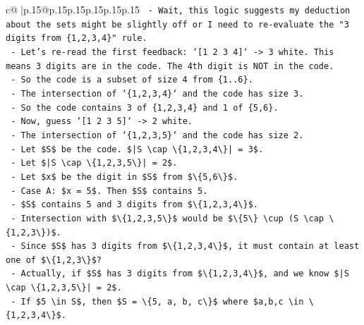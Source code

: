 \documentclass{article}
\begin{document}
{\begin{supertabular}{c@{$\;$}|p{.15\linewidth}@{}p{.15\linewidth}p{.15\linewidth}p{.15\linewidth}p{.15\linewidth}p{.15\linewidth}}
{{{\texttt{    {-} Wait, this logic suggests my deduction about the sets might be slightly off or I need to re{-}evaluate the "3 digits from \{1,2,3,4\}" rule.} \\
\texttt{    {-} Let's re{-}read the first feedback: `{[}1 2 3 4{]}` {-}> 3 white. This means 3 digits are in the code. The 4th digit is NOT in the code.} \\
\texttt{      {-} So the code is a subset of size 4 from \{1..6\}.} \\
\texttt{      {-} The intersection of `\{1,2,3,4\}` and the code has size 3.} \\
\texttt{      {-} So the code contains 3 of \{1,2,3,4\} and 1 of \{5,6\}.} \\
\texttt{    {-} Now, guess `{[}1 2 3 5{]}` {-}> 2 white.} \\
\texttt{      {-} The intersection of `\{1,2,3,5\}` and the code has size 2.} \\
\texttt{      {-} Let \$S\$ be the code. \$|S \textbackslash{}cap \textbackslash{}\{1,2,3,4\textbackslash{}\}| = 3\$.} \\
\texttt{      {-} Let \$|S \textbackslash{}cap \textbackslash{}\{1,2,3,5\textbackslash{}\}| = 2\$.} \\
\texttt{      {-} Let \$x\$ be the digit in \$S\$ from \$\textbackslash{}\{5,6\textbackslash{}\}\$.} \\
\texttt{      {-} Case A: \$x = 5\$. Then \$S\$ contains 5.} \\
\texttt{        {-} \$S\$ contains 5 and 3 digits from \$\textbackslash{}\{1,2,3,4\textbackslash{}\}\$.} \\
\texttt{        {-} Intersection with \$\textbackslash{}\{1,2,3,5\textbackslash{}\}\$ would be \$\textbackslash{}\{5\textbackslash{}\} \textbackslash{}cup (S \textbackslash{}cap \textbackslash{}\{1,2,3\textbackslash{}\})\$.} \\
\texttt{        {-} Since \$S\$ has 3 digits from \$\textbackslash{}\{1,2,3,4\textbackslash{}\}\$, it must contain at least one of \$\textbackslash{}\{1,2,3\textbackslash{}\}\$?} \\
\texttt{        {-} Actually, if \$S\$ has 3 digits from \$\textbackslash{}\{1,2,3,4\textbackslash{}\}\$, and we know \$|S \textbackslash{}cap \textbackslash{}\{1,2,3,5\textbackslash{}\}| = 2\$.} \\
\texttt{        {-} If \$5 \textbackslash{}in S\$, then \$S = \textbackslash{}\{5, a, b, c\textbackslash{}\}\$ where \$a,b,c \textbackslash{}in \textbackslash{}\{1,2,3,4\textbackslash{}\}\$.} \\
}}}
\end{supertabular}}
\end{document}

